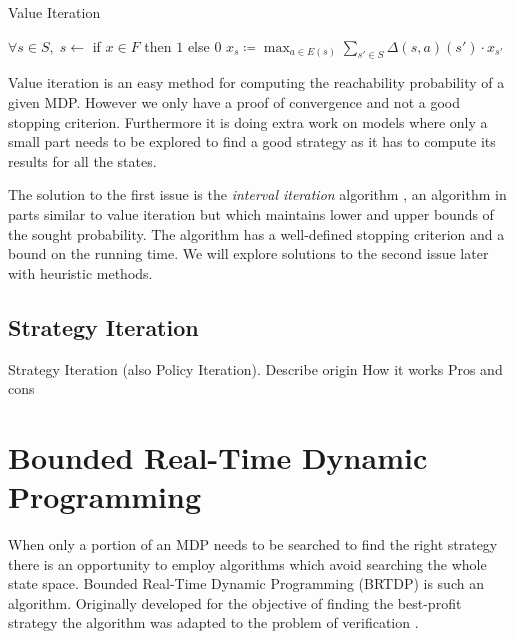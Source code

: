 \begin{algorithm}
\caption{Value Iteration}
\label{vi}
\begin{algorithmic}
    \State $\forall s \in S,\; s \gets$ if $x \in F$ then $1$ else $0$
    \Do
            \State $x_s \coloneqq
            \max_{a \in E(s)} \sum_{s' \in S} \Delta(s,a)(s') \cdot x_{s'}$
        \EndFor
\end{algorithmic}
\end{algorithm}

Value iteration is an easy method for computing the reachability
probability of a given MDP.  However we only have a proof of convergence
and not a good stopping criterion.  Furthermore it is doing extra work
on models where only a small part needs to be explored to find a good
strategy as it has to compute its results for all the states.

The solution to the first issue is the {\em interval iteration}
algorithm \parencite{interval_iteration}, an algorithm in parts similar
to value iteration but which maintains lower and upper bounds of the
sought probability. The algorithm has a well-defined stopping criterion
and a bound on the running time.  We will explore solutions to the
second issue later with heuristic methods.


\subsection{Strategy Iteration}

Strategy Iteration (also Policy Iteration).
Describe origin
How it works
Pros and cons

\section{Bounded Real-Time Dynamic Programming}

When only a portion of an MDP needs to be searched to find the right
strategy there is an opportunity to employ algorithms which avoid
searching the whole state space. Bounded Real-Time Dynamic Programming
(BRTDP) is such an algorithm. Originally developed for
the objective of finding the best-profit strategy
\parencite{profit_brtdp} the algorithm was adapted to the problem of
verification \parencite{atva14}.

